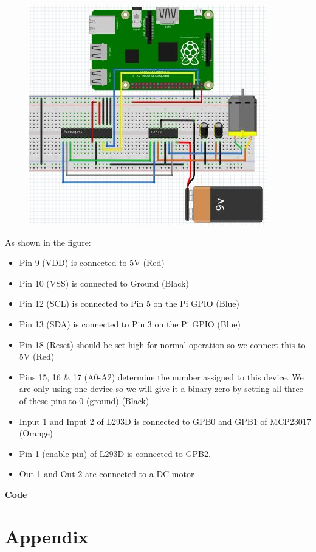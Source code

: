 \documentclass[11pt,a4paper]{article}
\begin{document}
	\begin{figure}[h!]
		\includegraphics[scale=0.6]{DC_motor_I2C.jpg}
		\centering
	\end{figure} 
	As shown in the figure:
	\begin{itemize}
		\item Pin 9 (VDD) is connected to 5V (Red)
		\item Pin 10 (VSS) is connected to Ground (Black)
		\item Pin 12 (SCL) is connected to Pin 5 on the Pi GPIO (Blue)
		\item Pin 13 (SDA) is connected to Pin 3 on the Pi GPIO (Blue)
		\item Pin 18 (Reset) should be set high for normal operation so we connect this to 5V (Red)
		\item Pins 15, 16 \& 17 (A0-A2) determine the number assigned to this device. We are only using one device so we will give it a binary zero by setting all three of these pins to 0 (ground) (Black)
		\item Input 1 and Input 2 of L293D is connected to GPB0 and GPB1 of MCP23017 (Orange)
		\item Pin 1 (enable pin) of L293D is connected to GPB2.
		\item Out 1 and Out 2 are connected to a DC motor
	\end{itemize}
	
	\newpage 
	\textbf{Code}
	\vspace{0.3cm}
	
	
	
	\newpage
	\section{Appendix}
	
\end{document}

